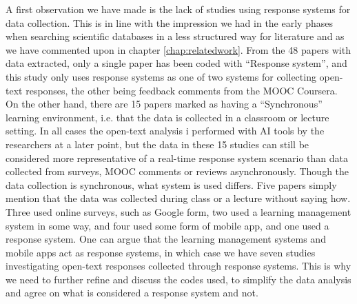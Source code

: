 A first observation we have made is the lack of studies using response systems for data collection. This is in line with the impression we had in the early phases when searching scientific databases in a less structured way for literature and as we have commented upon in chapter \ref{chap:relatedwork}. From the 48 papers with data extracted, only a single paper has been coded with ``Response system'', and this study only uses response systems as one of two systems for collecting open-text responses, the other being feedback comments from the MOOC Coursera. On the other hand, there are 15 papers marked as having a ``Synchronous'' learning environment, i.e. that the data is collected in a classroom or lecture setting. In all cases the open-text analysis i performed with AI tools by the researchers at a later point, but the data in these 15 studies can still be considered more representative of a real-time response system scenario than data collected from surveys, MOOC comments or reviews asynchronously. Though the data collection is synchronous, what system is used differs. Five papers simply mention that the data was collected during class or a lecture without saying how. Three used online surveys, such as Google form, two used a learning management system in some way, and four used some form of mobile app, and one used a response system. One can argue that the learning management systems and mobile apps act as response systems, in which case we have seven studies investigating open-text responses collected through response systems. This is why we need to further refine and discuss the codes used, to simplify the data analysis and agree on what is considered a response system and not.

